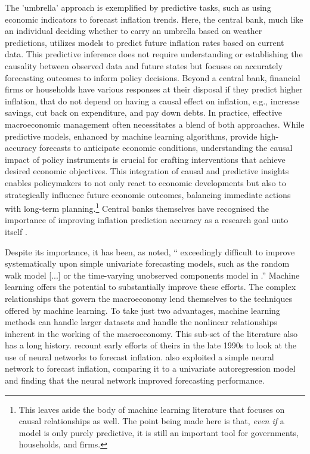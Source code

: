 The 'umbrella' approach is exemplified by predictive tasks, such as using economic indicators to forecast inflation trends. Here, the central bank, much like an individual deciding whether to carry an umbrella based on weather predictions, utilizes models to predict future inflation rates based on current data. This predictive inference does not require understanding or establishing the causality between observed data and future states but focuses on accurately forecasting outcomes to inform policy decisions. Beyond a central bank, financial firms or households have various responses at their disposal if they predict higher inflation, that do not depend on having a causal effect on inflation, e.g., increase savings, cut back on expenditure, and pay down debts. In practice, effective macroeconomic management often necessitates a blend of both approaches. While predictive models, enhanced by machine learning algorithms, provide high-accuracy forecasts to anticipate economic conditions, understanding the causal impact of policy instruments is crucial for crafting interventions that achieve desired economic objectives. This integration of causal and predictive insights enables policymakers to not only react to economic developments but also to strategically influence future economic outcomes, balancing immediate actions with long-term planning.\footnote{This leaves aside the body of machine learning literature that focuses on causal relationships as well. The point being made here is that, \textit{even if} a model is only purely predictive, it is still an important tool for governments, households, and firms.} Central banks themselves have recognised the importance of improving inflation prediction accuracy as a research goal unto itself \autocite{Chakraborty2017MachineBanks,SmalterHall2018MachineForecasting}.


Despite its importance, it has been, as \textcite{Stock2010ModelingCrisis} noted, `` exceedingly difficult to improve systematically upon simple univariate forecasting models, such as the \textcite{Atkeson2001AreInflation} random walk model [...] or the time-varying unobserved components model in \textcite{Stock2007WhyForecast}.” Machine learning offers the potential to substantially improve these efforts. The complex relationships that govern the macroeconomy lend themselves to the techniques offered by machine learning. To take just two advantages, machine learning methods can handle larger datasets and handle the nonlinear relationships inherent in the working of the macroeconomy. This sub-set of the literature also has a long history. \textcite{Stock2023ASeries} recount early efforts of theirs in the late 1990s to look at the use of neural networks to forecast inflation. \textcite{Nakamura2005InflationNetwork} also exploited a simple neural network to forecast inflation, comparing it to a univariate autoregression model and finding that the neural network improved forecasting performance. 

